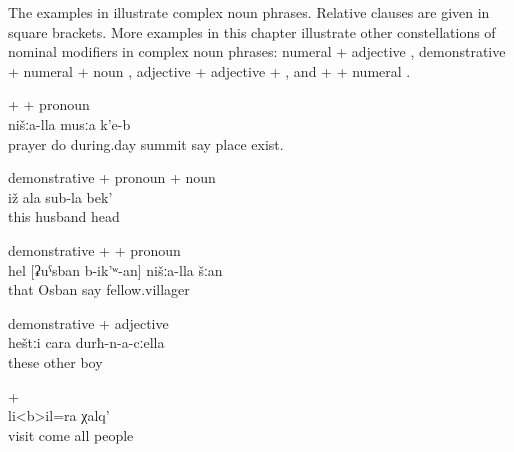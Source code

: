 The examples in  illustrate complex noun phrases. Relative clauses are given in square brackets. More examples in this chapter illustrate other constellations of nominal modifiers in complex noun phrases: numeral + adjective , demonstrative + numeral + noun , adjective + adjective +  , and  +  + numeral .
%
\begin{exe}
		\ex	{} +  +  pronoun\\	\label{ex:There is our place, called the midday summit, the praying summit@10a}
			nišːa-lla	musːa	k'e-b\\
			prayer	do	during.day	summit	say		place	exist.\\
		\glt	{}

		\ex	demonstrative +  pronoun +  noun\\	\label{ex:your husband's head@10b}
		\gll	iž	ala	sub-la	bek'\\
			this		husband	head\\
		\glt	{}

		\ex	demonstrative +  +  pronoun\\	\label{ex:that our fellow villager called Osban}
		\gll	hel	[ʡuˁsban	b-ik'ʷ-an]	nišːa-lla	šːan\\
			that	Osban	say		fellow.villager\\
		\glt	{}


		\ex	demonstrative + adjective\\				\label{ex:with these other boys}
		\gll	heštːi	cara	durħ-n-a-cːella\\
			these	other	boy\\
		\glt	{}
		
				\ex	{} + \\		\label{ex:all people who had come for a visit@11b}
		\gll	[šːatːir	sa-b-ač'-ib-te]	li<b>il=ra	χalq'\\
			visit	come 	all	people\\
		\glt	{}

\end{exe}

